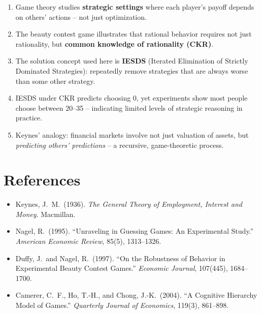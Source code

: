 \documentclass[12pt, a4paper]{article}
\begin{document}
\begin{takebox}
  \begin{enumerate}[label=\textbf{\arabic*.}, leftmargin=*]
    \item Game theory studies \textbf{strategic settings} where each player's payoff depends on others' actions -- not just optimization.
    \item The beauty contest game illustrates that rational behavior requires not just rationality, but \textbf{common knowledge of rationality (CKR)}.
    \item The solution concept used here is \textbf{IESDS} (Iterated Elimination of Strictly Dominated Strategies): repeatedly remove strategies that are always worse than some other strategy.
    \item IESDS under CKR predicts choosing $0$, yet experiments show most people choose between 20--35 -- indicating limited levels of strategic reasoning in practice.
    \item Keynes' analogy: financial markets involve not just valuation of assets, but \emph{predicting others' predictions} -- a recursive, game-theoretic process.
  \end{enumerate}
\end{takebox}

\section*{References}

\begin{itemize}[leftmargin=*, label={[}]
  \item[\lbrack 1\rbrack] Keynes, J.\ M.\ (1936). \textit{The General Theory of Employment, Interest and Money}. Macmillan.
  \item[\lbrack 2\rbrack] Nagel, R.\ (1995). ``Unraveling in Guessing Games: An Experimental Study.'' \textit{American Economic Review}, 85(5), 1313--1326.
  \item[\lbrack 3\rbrack] Duffy, J.\ and Nagel, R.\ (1997). ``On the Robustness of Behavior in Experimental Beauty Contest Games.'' \textit{Economic Journal}, 107(445), 1684--1700.
  \item[\lbrack 4\rbrack] Camerer, C.\ F., Ho, T.-H., and Chong, J.-K.\ (2004). ``A Cognitive Hierarchy Model of Games.'' \textit{Quarterly Journal of Economics}, 119(3), 861--898.
\end{itemize}
\end{document}
